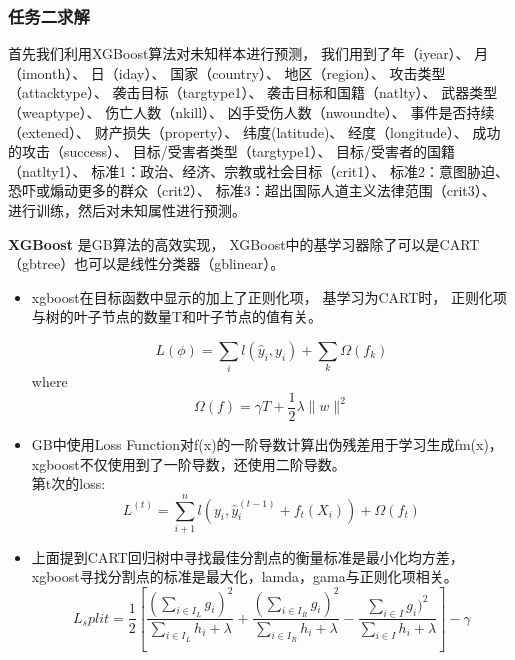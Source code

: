 \documentclass[bwprint]{gmcmthesis}
\begin{document}
\subsubsection{任务二求解}
首先我们利用XGBoost算法对未知样本进行预测，
我们用到了年（iyear）、
月（imonth）、
日（iday）、
国家（country）、
地区（region）、
攻击类型（attacktype）、
袭击目标（targtype1）、
袭击目标和国籍（natlty）、
武器类型（weaptype）、
伤亡人数（nkill）、
凶手受伤人数（nwoundte）、
事件是否持续（extened）、
财产损失（property）、
纬度(latitude)、
经度（longitude）、
成功的攻击（success）、
目标/受害者类型（targtype1）、
目标/受害者的国籍（natlty1）、
标准1：政治、经济、宗教或社会目标（crit1）、
标准2：意图胁迫、恐吓或煽动更多的群众（crit2）、
标准3：超出国际人道主义法律范围（crit3）、
进行训练，然后对未知属性进行预测。

\textbf{XGBoost}
是GB算法的高效实现，
XGBoost中的基学习器除了可以是CART（gbtree）也可以是线性分类器（gblinear）。
\begin{itemize}
  \item xgboost在目标函数中显示的加上了正则化项，
  基学习为CART时，
  正则化项与树的叶子节点的数量T和叶子节点的值有关。

  \begin{equation}
  L(\phi) = \sum_i l(\widehat{y}_i,y_i) + \sum_k \Omega(f_k)
  \end{equation}
  where
  \begin{equation}
  \Omega(f) = \gamma T + \frac{1}{2} \lambda \| w \|^2
  \end{equation}

  \item GB中使用Loss Function对f(x)的一阶导数计算出伪残差用于学习生成fm(x)，
  xgboost不仅使用到了一阶导数，还使用二阶导数。\\
  第t次的loss:
  \begin{equation}
  L^(t) = \sum_{i+1}^n l(y_i,\widehat{y}_i^{(t-1)}+f_t (X_i)) + \Omega(f_t)
  \end{equation}

  \item 上面提到CART回归树中寻找最佳分割点的衡量标准是最小化均方差，
  xgboost寻找分割点的标准是最大化，lamda，gama与正则化项相关。
  \begin{equation}
  L_split = \frac{1}{2}
  [ \frac{(\sum_{i\in{I_L}} g_i)^2}{\sum_{i\in{I_L}} h_i +\lambda}
  + \frac{(\sum_{i\in{I_R}} g_i)^2}{\sum_{i\in{I_R}} h_i +\lambda}
  - \frac{\sum_{i\in{I}} g_i)^2}{\sum_{i\in{I}} h_i +\lambda} ] - \gamma
  \end{equation}
\end{itemize}
\end{document}
